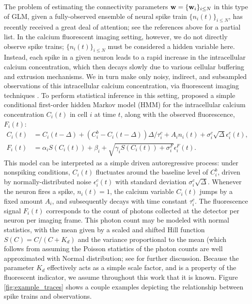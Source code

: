 The problem of estimating the connectivity parameters $\mathbf{w}=\{\mathbf{w}_i\}_{i\leq N}$ in this type of GLM, given a fully-observed ensemble of neural spike train $\{n_i(t)\}_{i\leq N}$, has recently received a great deal of attention; see the references above for a partial list. In the calcium fluorescent imaging setting, however, we do not directly observe spike trains; $\{n_i(t)\}_{i\leq N}$ must be considered a hidden variable here. Instead, each spike in a given neuron leads to a rapid increase in the intracellular calcium concentration, which then decays slowly due to various cellular buffering and extrusion mechanisms. We in turn make only noisy, indirect, and subsampled observations of this intracellular calcium concentration, via fluorescent imaging techniques \cite{ImagingManual}. To perform statistical inference in this setting, \cite{Vogelstein2009} proposed a simple conditional first-order hidden Markov model (HMM) for the intracellular calcium concentration $C_i(t)$ in cell $i$ at time $t$, along with the observed fluorescence, $F_i(t)$:
\begin{align}
\label{eqn:ca:definition}
C_i(t) &= C_i(t-\Delta) + (C_i^b-C_i(t-\Delta)) \Delta/\tau^c_i + A_i
n_i(t)+\sigma^c_i \sqrt{\Delta} \epsilon^c_i(t), \\ F_i(t) &= \alpha_i
S(C_i(t)) + \beta_i + \sqrt{\gamma_i S(C_i(t)) + \sigma^F_i}
\epsilon^F_i(t). \label{eqn:F:definition}
\end{align}
This model can be interpreted as a simple driven autoregressive process: under nonspiking conditions, $C_i(t)$ fluctuates around the baseline level of $C_i^b$, driven by normally-distributed noise $\epsilon^c_i(t)$ with standard deviation $\sigma^c_i \sqrt{\Delta}$. Whenever the neuron fires a spike, $n_i(t)=1$, the calcium variable $C_i(t)$ jumps by a fixed amount $A_i$, and subsequently decays with time constant $\tau^c_i$. The fluorescence signal $F_i(t)$ corresponds to the count of photons collected at the detector per neuron per imaging frame. This photon count may be modeled with normal statistics, with the mean given by a scaled and shifted Hill function $S(C)=C/(C+K_d)$ \cite{Yasuda2004} and the variance proportional to the mean (which follows from assuming the Poisson statistics of the photon counts are well approximated with Normal distribution; see \cite{Vogelstein2009} for further discussion. Because the parameter $K_d$ effectively acts as a simple scale factor, and is a property of the fluorescent indicator, we assume throughout this work that it is known. Figure \ref{fig:example_traces} shows a couple examples depicting the relationship between spike trains and observations.

